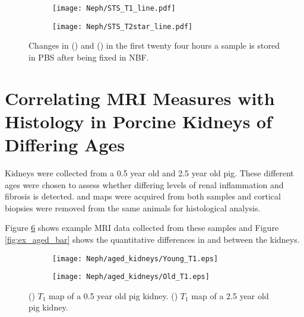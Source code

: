 \begin{figure}[H]
	\centering
	\begin{subfigure}[c]{0.47\textwidth}
		\centering
		\texttt{[image: Neph/STS\_T1\_line.pdf]}
		\caption{}
		\label{fig:ex_fixation_t1_3t_sts}
	\end{subfigure}
	\hfill
	\begin{subfigure}[c]{0.47\textwidth}
		\centering
		\texttt{[image: Neph/STS\_T2star\_line.pdf]}
		\caption{}
		\label{fig:ex_fixation_t2star_3t_sts}
	\end{subfigure}
	\caption{Changes in \tone () and \ttwostar () in the first twenty four hours a sample is stored in \ac{PBS} after being fixed in \ac{NBF}.}
	\label{fig:ex_fixation_sts}
\end{figure}

\section{Correlating MRI Measures with Histology in Porcine Kidneys of Differing Ages}
\label{sec:ex_ages}
Kidneys were collected from a 0.5 year old and 2.5 year old pig. These different ages were chosen to assess whether differing levels of renal inflammation and fibrosis is detected. \tone and \ttwostar maps were acquired from both samples and cortical biopsies were removed from the same animals for histological analysis. 

Figure \ref{fig:ex_aged_map} shows example \ac{MRI} data collected from these samples and Figure \ref{fig:ex_aged_bar} shows the quantitative differences in \tone and \ttwostar between the kidneys. 

\begin{figure}[H]
	\centering
	\begin{subfigure}[c]{0.47\textwidth}
		\centering
		\texttt{[image: Neph/aged\_kidneys/Young\_T1.eps]}
		\caption{}
		\label{fig:ex_aged_t1_map}
	\end{subfigure}
	\hfill
	\begin{subfigure}[c]{0.47\textwidth}
		\centering
		\texttt{[image: Neph/aged\_kidneys/Old\_T1.eps]}
		\caption{}
		\label{fig:ex_aged_t2star_map}
	\end{subfigure}
	\caption{() $T_1$ map of a 0.5 year old pig kidney. () $T_1$ map of a 2.5 year old pig kidney.}
	\label{fig:ex_aged_map}
\end{figure}

